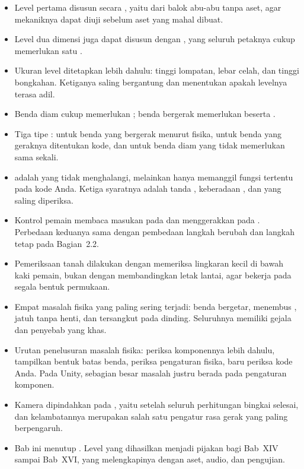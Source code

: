 
\begin{rangkumanbox}
\begin{itemize}
  \item Level pertama disusun secara , yaitu dari balok
        abu-abu tanpa aset, agar mekaniknya dapat diuji sebelum aset yang mahal
        dibuat.
  \item Level dua dimensi juga dapat disusun dengan , yang
        seluruh petaknya cukup memerlukan satu .
  \item Ukuran level ditetapkan lebih dahulu: tinggi lompatan, lebar celah, dan
        tinggi bongkahan. Ketiganya saling bergantung dan menentukan apakah
        levelnya terasa adil.
  \item Benda diam cukup memerlukan ; benda bergerak
        memerlukan  beserta .
  \item Tiga tipe :  untuk benda yang
        bergerak menurut fisika,  untuk benda yang geraknya
        ditentukan kode, dan  untuk benda diam yang tidak
        memerlukan  sama sekali.
  \item {} adalah  yang tidak menghalangi,
        melainkan hanya memanggil fungsi tertentu pada kode Anda. Ketiga
        syaratnya adalah tanda , keberadaan
        , dan  yang saling diperiksa.
  \item Kontrol pemain membaca masukan pada  dan menggerakkan
         pada . Perbedaan keduanya sama
        dengan pembedaan langkah berubah dan langkah tetap pada Bagian~2.2.
  \item Pemeriksaan tanah dilakukan dengan memeriksa lingkaran kecil di bawah
        kaki pemain, bukan dengan membandingkan letak lantai, agar bekerja pada
        segala bentuk permukaan.
  \item Empat masalah fisika yang paling sering terjadi: benda bergetar,
        menembus , jatuh tanpa henti, dan tersangkut pada
        dinding. Seluruhnya memiliki gejala dan penyebab yang khas.
  \item Urutan penelusuran masalah fisika: periksa komponennya lebih dahulu,
        tampilkan bentuk batas benda, periksa pengaturan fisika, baru periksa
        kode Anda. Pada Unity, sebagian besar masalah justru berada pada
        pengaturan komponen.
  \item Kamera dipindahkan pada , yaitu setelah seluruh
        perhitungan bingkai selesai, dan kelambatannya merupakan salah satu
        pengatur rasa gerak yang paling berpengaruh.
  \item Bab ini menutup . Level yang dihasilkan menjadi pijakan bagi
        Bab~XIV sampai Bab~XVI, yang melengkapinya dengan aset, audio, dan
        pengujian.
\end{itemize}
\end{rangkumanbox}
